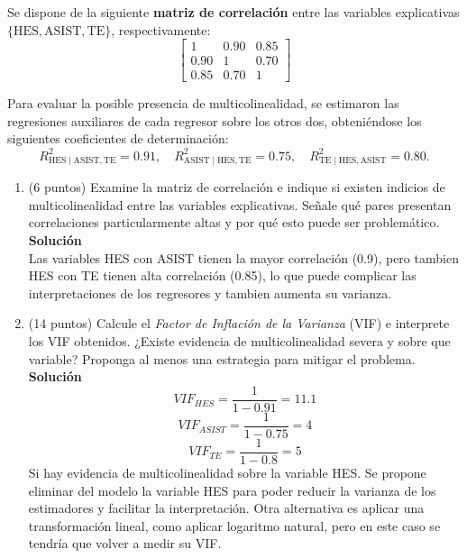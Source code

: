 \documentclass[10pt,a4paper]{article}
\begin{document}
\begin{enumerate}
Se dispone de la siguiente \textbf{matriz de correlación} entre las variables explicativas \(\{\text{HES}, \text{ASIST}, \text{TE}\}\), respectivamente:
\[
\begin{bmatrix}
1 & 0.90 & 0.85 \\
0.90 & 1 & 0.70 \\
0.85 & 0.70 & 1
\end{bmatrix}
\]

Para evaluar la posible presencia de multicolinealidad, se estimaron las regresiones auxiliares de cada regresor sobre los otros dos, obteniéndose los siguientes coeficientes de determinación:
\[
R^2_{\text{HES}\mid \text{ASIST},\text{TE}} = 0.91,\quad
R^2_{\text{ASIST}\mid \text{HES},\text{TE}} = 0.75,\quad
R^2_{\text{TE}\mid \text{HES},\text{ASIST}} = 0.80.
\]
\begin{enumerate}
  \item (6 puntos) Examine la matriz de correlación e indique si existen indicios de multicolinealidad entre las variables explicativas. Señale qué pares presentan correlaciones particularmente altas y por qué esto puede ser problemático.\\
  \textbf{Solución}
  \\
  Las variables HES con ASIST tienen la mayor correlación (0.9), pero tambien HES con TE tienen alta correlación (0.85), lo que puede complicar las interpretaciones de los regresores y tambien aumenta su varianza.
  
  \item (14 puntos) Calcule el \textit{Factor de Inflación de la Varianza} (VIF) e interprete los VIF obtenidos. ¿Existe evidencia de multicolinealidad severa y sobre que variable? Proponga al menos una estrategia para mitigar el problema.\\
  \textbf{Solución}
  \\
    $$VIF_{HES}=\frac{1}{1-0.91}=11.1$$
    $$VIF_{ASIST}=\frac{1}{1-0.75}=4$$
    $$VIF_{TE}=\frac{1}{1-0.8}=5$$
    Si hay evidencia de multicolinealidad sobre la variable HES. Se propone eliminar del modelo la variable HES para poder reducir la varianza de los estimadores y facilitar la interpretación. Otra alternativa es aplicar una transformación lineal, como aplicar logaritmo natural, pero en este caso se tendría que volver a medir su VIF.
 \end{enumerate}


\end{enumerate}
\end{document}
